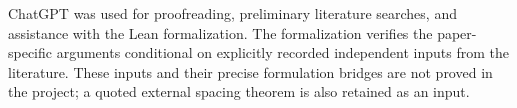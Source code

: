 ChatGPT was used for proofreading, preliminary literature searches,
and assistance with the Lean formalization. The formalization verifies
the paper-specific arguments conditional on explicitly recorded independent
inputs from the literature. These inputs and their precise formulation
bridges are not proved in the project; a quoted external spacing theorem
is also retained as an input.


